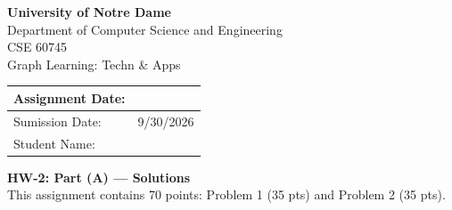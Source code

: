\documentclass[11pt]{article}
\begin{document}
\thispagestyle{fancy}
\begin{center}
\vspace*{2.2cm}
{\fontsize{28}{34}\selectfont\bfseries\sffamily University of Notre Dame}\\[0.9cm]
{\fontsize{22}{28}\selectfont Department of Computer Science and Engineering}\\[2.6cm]
{\fontsize{22}{28}\selectfont CSE 60745}\\[0.7cm]
{\fontsize{22}{28}\selectfont Graph Learning: Techn \& Apps}\\[2.2cm]

\setlength{\tabcolsep}{10pt}
\renewcommand{\arraystretch}{3.0}
\begin{tabular}{|p{}|p{}|}
\hline
Assignment Date: & \\
\hline
Sumission Date: & 9/30/2026 \\
\hline
Student Name: & \\
\hline
\end{tabular}
\end{center}
\clearpage

\begin{center}
{\large\bfseries HW-2: Part (A) --- Solutions}\\[0.3em]
{\small This assignment contains 70 points: Problem 1 (35 pts) and Problem 2 (35 pts).}
\end{center}

\vspace{0.6em}



\clearpage


\end{document}
